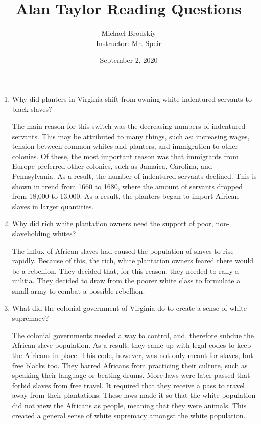 \documentclass[12pt]{article}
\title{Alan Taylor Reading Questions}
\date{September 2, 2020}
\author{Michael Brodskiy\\ \small Instructor: Mr. Speir}
\begin{document}
\begin{enumerate}

  \item Why did planters in Virginia shift from owning white indentured servants to black slaves?

    \begin{justify} The main reason for this switch was the decreasing numbers of indentured servants. This may be attributed to many things, such as: increasing wages, tension between common whites and planters, and immigration to other colonies. Of these, the most important reason was that immigrants from Europe preferred other colonies, such as Jamaica, Carolina, and Pennsylvania. As a result, the number of indentured servants declined. This is shown in trend from 1660 to 1680, where the amount of servants dropped from 18,000 to 13,000. As a result, the planters began to import African slaves in larger quantities. \end{justify}

  \item Why did rich white plantation owners need the support of poor, non-slaveholding whites?

    \begin{justify} The influx of African slaves had caused the population of slaves to rise rapidly. Because of this, the rich, white plantation owners feared there would be a rebellion. They decided that, for this reason, they needed to rally a militia. They decided to draw from the poorer white class to formulate a small army to combat a possible rebellion. \end{justify}

  \item What did the colonial government of Virginia do to create a sense of white supremacy?

    \begin{justify} The colonial governments needed a way to control, and, therefore subdue the African slave population. As a result, they came up with legal codes to keep the Africans in place. This code, however, was not only meant for slaves, but free blacks too. They barred Africans from practicing their culture, such as speaking their language or beating drums. More laws were later passed that forbid slaves from free travel. It required that they receive a pass to travel away from their plantations. These laws made it so that the white population did not view the Africans as people, meaning that they were animals. This created a general sense of white supremacy amongst the white population. \end{justify}


\end{enumerate}
\end{document}
